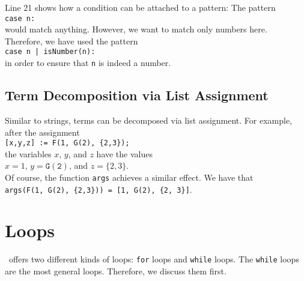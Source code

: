 Line 21 shows how a condition can be attached to a pattern:  The pattern 
\\[0.2cm]
\hspace*{1.3cm}
\texttt{case n:}
\\[0.2cm]
would match anything.  However, we want to match only numbers here.  Therefore, we have used
the pattern
\\[0.2cm]
\hspace*{1.3cm}
\texttt{case n | isNumber(n):}
\\[0.2cm]
in order to ensure that \texttt{n} is indeed a number.

\subsection{Term Decomposition via List Assignment}
Similar to strings, terms can be decomposed via list assignment.  For example, after the assignment
\\[0.2cm]
\hspace*{1.3cm}
\texttt{[x,y,z] := F(1, G(2), \{2,3\});}
\\[0.2cm]
the variables $x$, $y$, and $z$ have the values
\\[0.2cm]
\hspace*{1.3cm}
$x = 1$, \quad $y = \mathtt{G(2)}$, \quad and \quad $z = \{2,3\}$.
\\[0.2cm]
Of course, the function \texttt{args} achieves a similar effect.  We have that
\\[0.2cm]
\hspace*{1.3cm}
\texttt{args(F(1, G(2), \{2,3\})) = [1, G(2), \{2, 3\}]}.

\section{Loops}
\setlx\ offers two different kinds of loops: \texttt{for} loops and \texttt{while} loops.  The
\texttt{while} loops are the most general loops.  Therefore, we discuss them first.  

